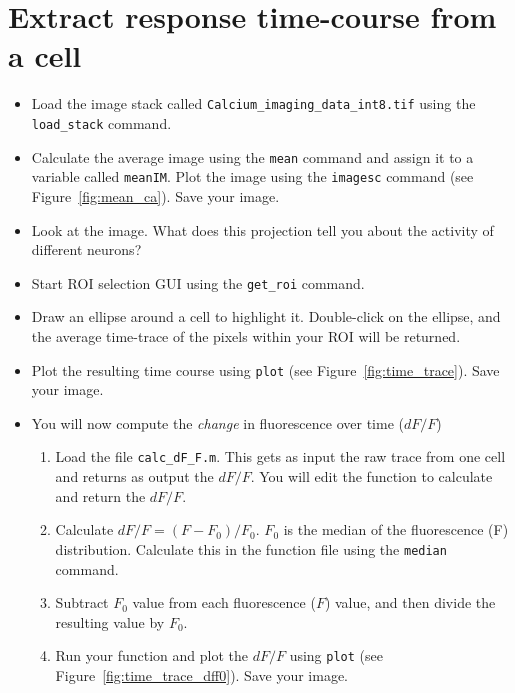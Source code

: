 \documentclass[paper=a4, fontsize=11pt]{scrartcl} %
\numberwithin{equation}{section} %
\numberwithin{figure}{section} %
\numberwithin{table}{section} %
\begin{document}
\section{Extract response time-course from a cell}
\begin{itemize}
\setlength{\parskip}{0.25em}
\item Load the image stack called \texttt{Calcium\_imaging\_data\_int8.tif} using the \texttt{load\_stack} command.
\item Calculate the average image using the \texttt{mean} command and assign it to a variable called \texttt{meanIM}.  Plot the image using the \texttt{imagesc} command (see Figure~\ref{fig:mean_ca}). Save your image.
\item Look at the image. What does this projection tell you about the activity of different neurons?
\item Start ROI selection GUI using the \texttt{get\_roi} command.
\item Draw an ellipse around a cell to highlight it. Double-click on the ellipse, and the average time-trace of the pixels within your ROI will be returned.
\item Plot the resulting time course using \texttt{plot} (see Figure~\ref{fig:time_trace}). Save your image.
\item You will now compute the \textit{change} in fluorescence over time ($dF/F$)
	\begin{enumerate}
	\item Load the file \texttt{calc\_dF\_F.m}. This gets as input the raw trace from one cell and returns as output the $dF/F$. You will edit	the function to calculate and return the $dF/F$.
	\item Calculate $dF/F = (F-F_0)/F_0$. $F_0$ is the median of the fluorescence (F) distribution. Calculate this in the function file using the \texttt{median} command.
	\item Subtract $F_0$ value from each fluorescence ($F$) value, and then divide the resulting value by $F_0$.
	\item Run your function and plot the $dF/F$ using \texttt{plot} (see Figure~\ref{fig:time_trace_dff0}). Save your image.
	\end{enumerate}
\end{itemize}
\end{document}
